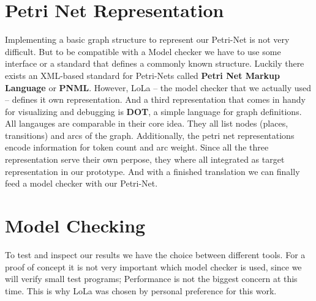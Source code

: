 \section{Petri Net Representation}
\label{app_petri}
Implementing a basic graph structure to represent our Petri-Net is not very difficult.
But to be compatible with a Model checker we have to use some interface or a standard that
defines a commonly known structure.
Luckily there exists an XML-based standard for Petri-Nets called \textbf{Petri Net Markup Language}\cite{pnml}\cite{kindler2006petri} or \textbf{PNML}.
However, LoLa -- the model checker that we actually used -- defines it own representation.
And a third representation that comes in handy for visualizing and debugging is \textbf{DOT}\cite{koutsofios1996drawing}, a simple language for graph definitions.
All langauges are comparable in their core idea.
They all list nodes (places, transitions) and arcs of the graph. 
Additionally, the petri net representations encode information for token count and arc weight.
Since all the three representation serve their own perpose, they where all integrated as target representation in our prototype.
And with a finished translation we can finally feed a model checker with our Petri-Net.

\section{Model Checking}
\label{app_mc}
To test and inspect our results we have the choice between different tools.
For a proof of concept it is not very important which model checker is used, since we will verify small test programs;
Performance is not the biggest concern at this time.
This is why LoLa was chosen by personal preference for this work.

